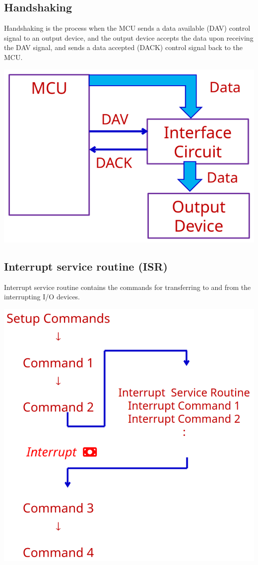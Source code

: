 \documentclass[11pt]{article}
\begin{document}
\subsection{Handshaking}
\label{sec:org5158e81}
Handshaking is the process when the MCU sends a data available (DAV) control signal to an output device, and the output device accepts the data upon receiving the DAV signal, and sends a data accepted (DACK) control signal back to the MCU.

\begin{center}
\includegraphics[scale=1]{./images/handshaking-diagram.png}
\end{center}

\subsection{Interrupt service routine (ISR)}
\label{sec:orga1b6f92}
Interrupt service routine contains the commands for transferring to and from the interrupting I/O devices.

\begin{center}
\includegraphics[width=.9\linewidth]{./images/interrupt-service-routine-diagram.png}
\end{center}
\end{document}
